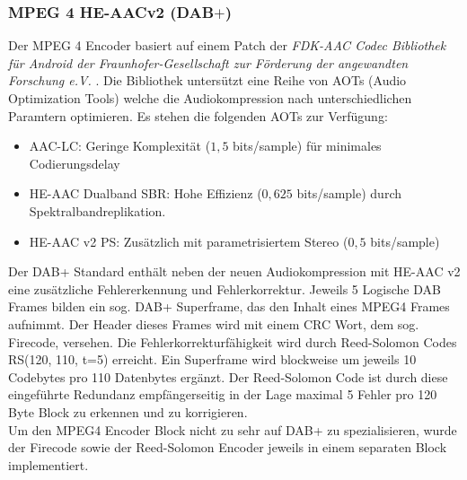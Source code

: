 \subsubsection{MPEG 4 HE-AACv2 (DAB$+$)}
Der MPEG 4 Encoder basiert auf einem Patch der \textit{FDK-AAC Codec Bibliothek für Android der Fraunhofer-Gesellschaft zur Förderung der angewandten Forschung e.V.} \cite{repo:fdk-aac}. Die Bibliothek untersützt eine Reihe von AOTs (Audio Optimization Tools) welche die Audiokompression nach unterschiedlichen Paramtern optimieren. Es stehen die folgenden AOTs zur Verfügung:
\begin{itemize}
\item AAC-LC: Geringe Komplexität ($1,5$ bits/sample) für minimales Codierungsdelay
\item HE-AAC Dualband SBR: Hohe Effizienz ($0,625$ bits/sample) durch Spektralbandreplikation.
\item HE-AAC v2 PS: Zusätzlich mit parametrisiertem Stereo ($0,5$ bits/sample)
\end{itemize}
Der DAB+ Standard enthält neben der neuen Audiokompression mit HE-AAC v2 eine zusätzliche Fehlererkennung und Fehlerkorrektur. Jeweils 5 Logische DAB Frames bilden ein sog. DAB+ Superframe, das den Inhalt eines MPEG4 Frames aufnimmt. Der Header dieses Frames wird mit einem CRC Wort, dem sog. Firecode, versehen. Die Fehlerkorrekturfähigkeit wird durch Reed-Solomon Codes RS(120, 110, t=5) erreicht. Ein Superframe wird blockweise um jeweils 10 Codebytes pro 110 Datenbytes ergänzt. Der Reed-Solomon Code ist durch diese eingeführte Redundanz empfängerseitig in der Lage maximal 5 Fehler pro 120 Byte Block zu erkennen und zu korrigieren.\\
Um den MPEG4 Encoder Block nicht zu sehr auf DAB+ zu spezialisieren, wurde der Firecode sowie der Reed-Solomon Encoder jeweils in einem separaten Block implementiert.

